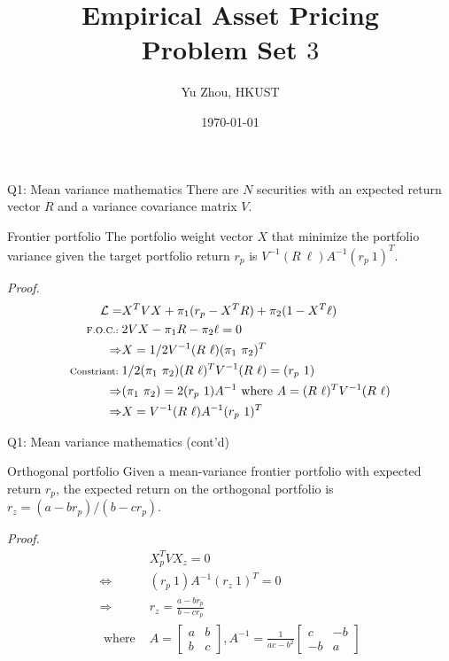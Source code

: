 \documentclass[10pt,t]{beamer}
\title{Empirical Asset Pricing \\ Problem Set $3$}
\author{Yu Zhou, HKUST}
\date{\today}
\begin{document}
\maketitle

\begin{frame}{Q1: Mean variance mathematics}
There are $N$ securities with an expected return vector $R$ and a variance covariance matrix $V$.

\begin{block}{Frontier portfolio}
The portfolio weight vector $X$ that minimize the portfolio variance given the target portfolio return $r_p$ is $V^{-1} (R \ \ell) A^{-1} (r_p \ 1)^{T}$.

\baselineskip
\textit{Proof.}
\begin{equation*}
\begin{split}
\mathcal{L} = & X^T V X + \pi_1 (r_p - X^TR) + \pi_2 (1 - X^T\ell) \\
\text{\scriptsize F.O.C.:\ } & 2 VX - \pi_1 R - \pi_2 \ell = 0 \\
\Rightarrow & X = 1/2 V^{-1} (R \ \ell) (\pi_1 \ \pi_2)^T \\
\text{\scriptsize Constriant:\ }& 1/2 (\pi_1 \ \pi_2) (R \ \ell)^T V^{-1} (R \ \ell) = (r_p \ 1) \\
\Rightarrow & (\pi_1 \ \pi_2) = 2 (r_p \ 1) A^{-1} \text{ where } A = (R \ \ell)^T V^{-1} (R \ \ell)\\
\Rightarrow & X = V^{-1} (R \ \ell) A^{-1} (r_p \ 1)^{T}
\end{split}
\end{equation*}
\end{block}
\end{frame}




\begin{frame}{Q1: Mean variance mathematics (cont'd)}
\begin{block}{Orthogonal portfolio}
Given a mean-variance frontier portfolio with expected return $r_p$, the expected return on the orthogonal portfolio is $r_z = (a - b r_p)/(b - c r_p)$.

\baselineskip
\textit{Proof.}
\begin{equation*}
\begin{split}
& X_p^T V X_z = 0 \\
\Leftrightarrow & (r_p \ 1) A^{-1} (r_z \ 1)^T = 0 \\
\Rightarrow & r_z = \frac{a - b r_p}{b - c r_p} \\
\text{ where } & A = \left[\begin{array}{cc}a & b \\ b & c\end{array}\right], A^{-1} = \frac{1}{ac - b^2}\left[\begin{array}{cc}c & -b \\ -b & a\end{array}\right]
\end{split}
\end{equation*}
\end{block}
\end{frame}
\end{document}
